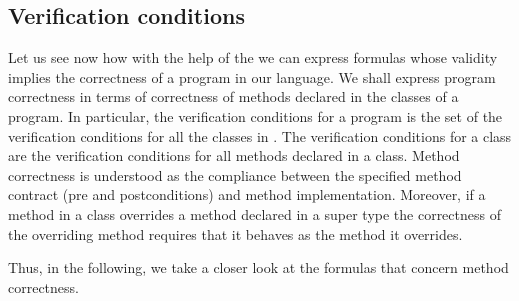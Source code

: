 \newtheorem{thmVC}{Definition}[section]

\subsection{Verification conditions} \label{wp:vcMeth}
Let us see now how with the help of the \wpName{} we can express 
formulas whose validity implies the correctness of a program in our language.
We shall express program correctness in terms of correctness of
methods declared in the classes of a program. 
In particular, the verification conditions  for a program  is the set of 
 the verification conditions for all the classes in \Program{}.
The verification conditions for a class are the verification conditions for
all methods declared in a class. 
Method correctness is understood 
as the compliance between the specified method contract (pre and
postconditions) and method implementation. 
Moreover, if a method in a class overrides a method declared in a super type
the correctness of the overriding method requires that it behaves as the
method it overrides. 

Thus, in the following, we take a closer look at
 the formulas that concern method correctness.

